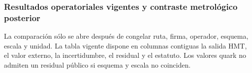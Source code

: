 \let\subsection\subsubsection
\let\subsubsection\paragraph
\let\clearpage\relax

\endgroup
\begingroup
\let\chapter\section
\let\section\subsection
\let\subsection\subsubsection
\let\subsubsection\paragraph
\let\clearpage\relax

\endgroup

\section{Resultados operatoriales vigentes y contraste metrológico posterior}
La comparación sólo se abre después de congelar ruta, firma, operador,
esquema, escala y unidad. La tabla vigente dispone en columnas contiguas la
salida HMT, el valor externo, la incertidumbre, el residual y el estatuto. Los
valores quark no admiten un residual público si esquema y escala no coinciden.

